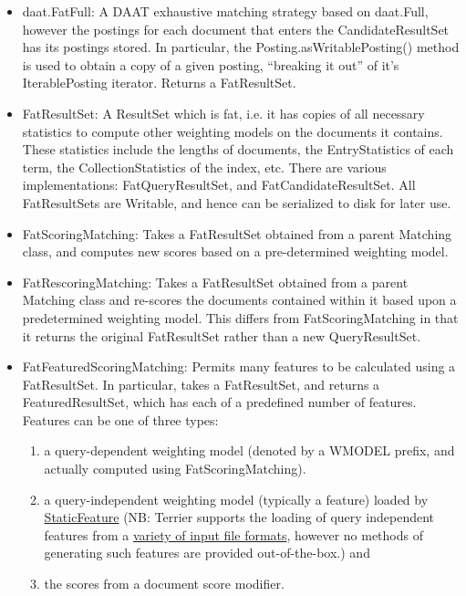 \begin{itemize}
\item
  daat.FatFull: A DAAT exhaustive matching strategy based on daat.Full,
  however the postings for each document that enters the
  CandidateResultSet has its postings stored. In particular, the
  Posting.asWritablePosting() method is used to obtain a copy of a given
  posting, ``breaking it out'' of it's IterablePosting iterator. Returns
  a FatResultSet.
\item
  FatResultSet: A ResultSet which is fat, i.e. it has copies of all
  necessary statistics to compute other weighting models on the
  documents it contains. These statistics include the lengths of
  documents, the EntryStatistics of each term, the CollectionStatistics
  of the index, etc. There are various implementations:
  FatQueryResultSet, and FatCandidateResultSet. All FatResultSets are
  Writable, and hence can be serialized to disk for later use.
\item
  FatScoringMatching: Takes a FatResultSet obtained from a parent
  Matching class, and computes new scores based on a pre-determined
  weighting model.
\item
  FatRescoringMatching: Takes a FatResultSet obtained from a parent
  Matching class and re-scores the documents contained within it based
  upon a predetermined weighting model. This differs from
  FatScoringMatching in that it returns the original FatResultSet rather
  than a new QueryResultSet.
\item
  FatFeaturedScoringMatching: Permits many features to be calculated
  using a FatResultSet. In particular, takes a FatResultSet, and returns
  a FeaturedResultSet, which has each of a predefined number of
  features. Features can be one of three types:

  \begin{enumerate}
  \tightlist
  \item
    a query-dependent weighting model (denoted by a WMODEL prefix, and
    actually computed using FatScoringMatching).
  \item
    a query-independent weighting model (typically a feature) loaded by
    \href{javadoc/org/terrier/matching/models/StaticFeature.html}{StaticFeature}
    (NB: Terrier supports the loading of query independent features from
    a
    \href{javadoc/org/terrier/matching/models/StaticScoreModifierWeightingModel.html}{variety
    of input file formats}, however no methods of generating such
    features are provided out-of-the-box.) and
  \item
    the scores from a document score modifier.
  \end{enumerate}


\end{itemize}
